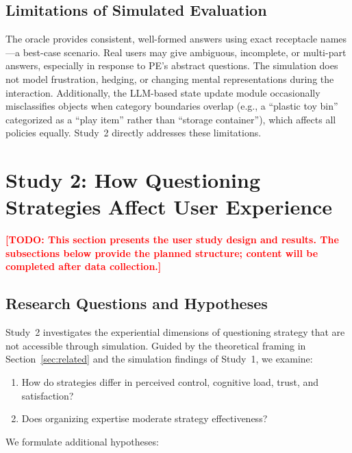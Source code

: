 \documentclass[a4paper,fleqn]{cas-sc}
\newcommand{\TODO}[1]{\textcolor{red}{\textbf{[TODO: #1]}}}
\begin{document}
\subsection{Limitations of Simulated Evaluation}

The oracle provides consistent, well-formed answers using exact receptacle names---a best-case scenario. Real users may give ambiguous, incomplete, or multi-part answers, especially in response to PE's abstract questions. The simulation does not model frustration, hedging, or changing mental representations during the interaction. Additionally, the LLM-based state update module occasionally misclassifies objects when category boundaries overlap (e.g., a ``plastic toy bin'' categorized as a ``play item'' rather than ``storage container''), which affects all policies equally. Study~2 directly addresses these limitations.


\section{Study 2: How Questioning Strategies Affect User Experience}\label{sec:study2}

\TODO{This section presents the user study design and results. The subsections below provide the planned structure; content will be completed after data collection.}

\subsection{Research Questions and Hypotheses}

Study~2 investigates the experiential dimensions of questioning strategy that are not accessible through simulation. Guided by the theoretical framing in Section~\ref{sec:related} and the simulation findings of Study~1, we examine:

\begin{enumerate}[label=\textbf{RQ\arabic*:},leftmargin=*]
    \item[RQ3.] How do strategies differ in perceived control, cognitive load, trust, and satisfaction?
    \item[RQ4.] Does organizing expertise moderate strategy effectiveness?
\end{enumerate}

We formulate additional hypotheses:
\end{document}
